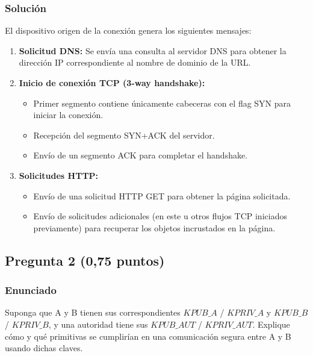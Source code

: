 \documentclass[12pt]{article}
\begin{document}
\subsubsection{Solución}
El dispositivo origen de la conexión genera los siguientes mensajes:  
\begin{enumerate}
    \item \textbf{Solicitud DNS:} Se envía una consulta al servidor DNS para obtener la dirección IP correspondiente al nombre de dominio de la URL.
    \item \textbf{Inicio de conexión TCP (3-way handshake):}  
    \begin{itemize}
        \item Primer segmento contiene únicamente cabeceras con el flag SYN para iniciar la conexión.
        \item Recepción del segmento SYN+ACK del servidor.
        \item Envío de un segmento ACK para completar el handshake.
    \end{itemize}
    \item \textbf{Solicitudes HTTP:}  
    \begin{itemize}
        \item Envío de una solicitud HTTP GET para obtener la página solicitada.
        \item Envío de solicitudes adicionales (en este u otros flujos TCP iniciados previamente) para recuperar los objetos incrustados en la página.
    \end{itemize}
\end{enumerate}

\subsection{Pregunta 2 (0,75 puntos)}
\subsubsection{Enunciado}
Suponga que A y B tienen sus correspondientes \( KPUB\_A \) / \( KPRIV\_A \) y \( KPUB\_B \) / \( KPRIV\_B \), y una autoridad tiene sus \( KPUB\_AUT \) / \( KPRIV\_AUT \). Explique cómo y qué primitivas se cumplirían en una comunicación segura entre A y B usando dichas claves.
\end{document}

